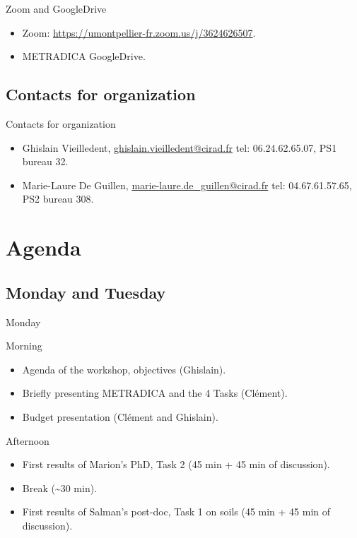 \documentclass[10pt,table,dvipsnames,compress]{beamer}
\begin{document}
\begin{frame}[label={sec:org7c42870}]{Zoom and GoogleDrive}
\begin{itemize}
\item Zoom: \url{https://umontpellier-fr.zoom.us/j/3624626507}.
\item METRADICA GoogleDrive.
\end{itemize}
\end{frame}

\subsection{Contacts for organization}
\label{sec:org5aba035}

\begin{frame}[label={sec:org9db85c4}]{Contacts for organization}
\begin{itemize}
\item Ghislain Vieilledent, \href{mailto:ghislain.vieilledent@cirad.fr}{ghislain.vieilledent@cirad.fr} \newline tel: 06.24.62.65.07, PS1 bureau 32.
\item Marie-Laure De Guillen, \href{mailto:marie-laure.de\_guillen@cirad.fr}{marie-laure.de\_guillen@cirad.fr} \newline tel: 04.67.61.57.65, PS2 bureau 308.
\end{itemize}
\end{frame}

\section{Agenda}
\label{sec:org4e715cf}

\subsection{Monday and Tuesday}
\label{sec:org244b053}

\begin{frame}[label={sec:org0d6089f}]{Monday}
\begin{block}{Morning}
\begin{itemize}
\item Agenda of the workshop, objectives (Ghislain).
\item Briefly presenting METRADICA and the 4 Tasks (Clément).
\item Budget presentation (Clément and Ghislain).
\end{itemize}
\end{block}

\begin{block}{Afternoon}
\begin{itemize}
\item First results of Marion's PhD, Task 2 (45 min + 45 min of discussion).
\item Break (\textasciitilde{}30 min).
\item First results of Salman's post-doc, Task 1 on soils (45 min + 45 min of discussion).
\end{itemize}
\end{block}
\end{frame}
\end{document}
